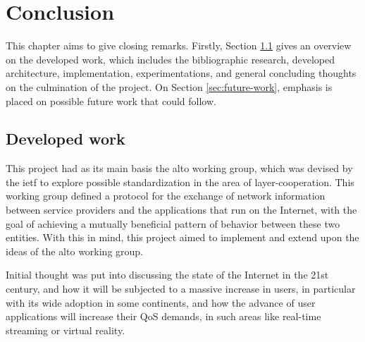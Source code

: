 \chapter{Conclusion}

    This chapter aims to give closing remarks.
    Firstly, Section \ref{sec:conclusion} gives an overview on the developed work, which includes the bibliographic research, developed architecture, implementation, experimentations, and general concluding thoughts on the culmination of the project.
    On Section \ref{sec:future-work}, emphasis is placed on possible future work that could follow.

\section{Developed work}

\label{sec:conclusion}

    This project had as its main basis the \gls{alto} working group, which was devised by the \gls{ietf} to explore possible standardization in the area of layer-cooperation.
    This working group defined a protocol for the exchange of network information between service providers and the applications that run on the Internet, with the goal of achieving a mutually beneficial pattern of behavior between these two entities.
    With this in mind, this project aimed to implement and extend upon the ideas of the \gls{alto} working group.

    Initial thought was put into discussing the state of the Internet in the 21st century, and how it will be subjected to a massive increase in users, in particular with its wide adoption in some continents, and how the advance of user applications will increase their QoS demands, in such areas like real-time streaming or virtual reality.


